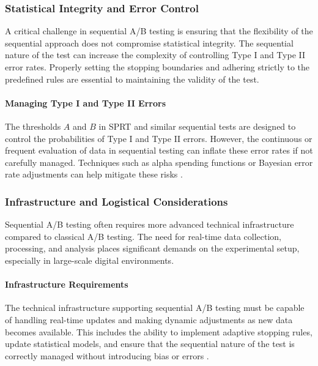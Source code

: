 \documentclass[magisterska, english]{pwr_wmat_praca_dyplomowa}
\theoremstyle{plain}
\numberwithin{theorem}{chapter}
\theoremstyle{definition}
\numberwithin{theorem}{chapter}
\begin{document}
\subsubsection{Statistical Integrity and Error Control}

A critical challenge in sequential A/B testing is ensuring that the flexibility of the sequential approach does not compromise statistical integrity. The sequential nature of the test can increase the complexity of controlling Type I and Type II error rates. Properly setting the stopping boundaries and adhering strictly to the predefined rules are essential to maintaining the validity of the test.

\paragraph{Managing Type I and Type II Errors}

The thresholds \( A \) and \( B \) in SPRT and similar sequential tests are designed to control the probabilities of Type I and Type II errors. However, the continuous or frequent evaluation of data in sequential testing can inflate these error rates if not carefully managed. Techniques such as alpha spending functions or Bayesian error rate adjustments can help mitigate these risks \cite{DeMets1994}.

\subsubsection{Infrastructure and Logistical Considerations}

Sequential A/B testing often requires more advanced technical infrastructure compared to classical A/B testing. The need for real-time data collection, processing, and analysis places significant demands on the experimental setup, especially in large-scale digital environments.

\paragraph{Infrastructure Requirements}

The technical infrastructure supporting sequential A/B testing must be capable of handling real-time updates and making dynamic adjustments as new data becomes available. This includes the ability to implement adaptive stopping rules, update statistical models, and ensure that the sequential nature of the test is correctly managed without introducing bias or errors \cite{Montgomery2008}.
\end{document}
